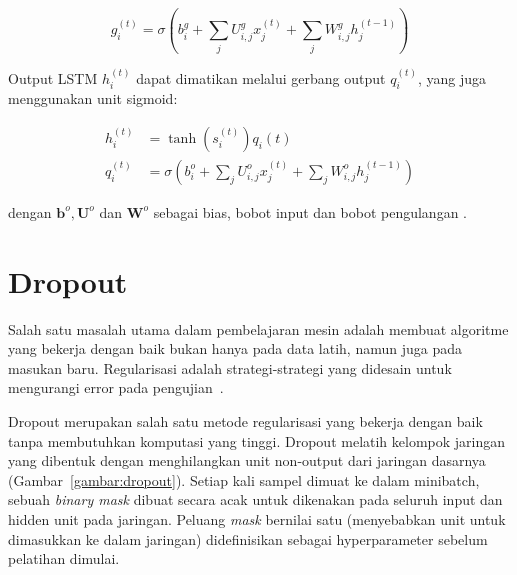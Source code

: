 \begin{equation}
    g_{i}^{(t)} = \sigma\left(b_{i}^{g} + \sum_{j} U_{i,j}^{g} x_{j}^{(t)} + \sum_{j} W_{i,j}^{g} h_{j}^{(t-1)}\right)
\end{equation}

Output LSTM $h_{i}^{(t)}$ dapat dimatikan melalui gerbang output $q_{i}^{(t)}$, yang juga menggunakan unit sigmoid:

\begin{align}
    \label{eq:output-lstm}
    h_{i}^{(t)} &= \tanh\left(s_{i}^{(t)}\right) q_{i}{(t)} \\
    q_{i}^{(t)} &= \sigma\left(b_{i}^{o} + \sum_{j} U_{i,j}^{o} x_{j}^{(t)} + \sum_{j} W_{i,j}^{o} h_{j}^{(t-1)} \right)
\end{align}

\noindent
dengan $\pmb{b}^{o}, \pmb{U}^{o}$ dan $\pmb{W}^{o}$ sebagai bias, bobot input dan bobot pengulangan \Parencite{Goodfellow-2016}.


\section{Dropout}
Salah satu masalah utama dalam pembelajaran mesin adalah membuat algoritme yang bekerja dengan baik bukan hanya pada data latih, namun juga pada masukan baru. Regularisasi adalah strategi-strategi yang didesain untuk mengurangi error pada pengujian~\Parencite{Goodfellow-2016}.

Dropout merupakan salah satu metode regularisasi yang bekerja dengan baik tanpa membutuhkan komputasi yang tinggi. Dropout melatih kelompok jaringan yang dibentuk dengan menghilangkan unit non-output dari jaringan dasarnya (Gambar~\ref{gambar:dropout}). Setiap kali sampel dimuat ke dalam minibatch, sebuah \textit{binary mask} dibuat secara acak untuk dikenakan pada seluruh input dan hidden unit pada jaringan. Peluang \textit{mask} bernilai satu (menyebabkan unit untuk dimasukkan ke dalam jaringan) didefinisikan sebagai hyperparameter sebelum pelatihan dimulai.

